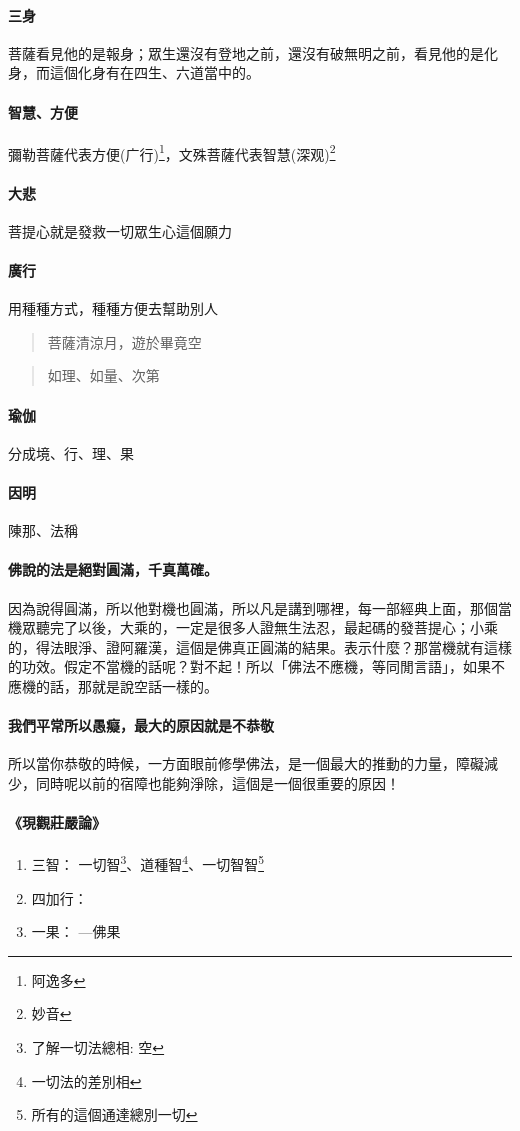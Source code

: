 \paragraph{三身}
菩薩看見他的是報身；眾生還沒有登地之前，還沒有破無明之前，看見他的是化身，而這個化身有在四生、六道當中的。
\paragraph{智慧、方便}
彌勒菩薩代表方便(广行)\footnote{阿逸多}，文殊菩薩代表智慧(深观)\footnote{妙音}
\paragraph{大悲}
菩提心就是發救一切眾生心這個願力
\paragraph{廣行}
用種種方式，種種方便去幫助別人
\begin{quote}
  菩薩清涼月，遊於畢竟空
\end{quote}
\begin{quote}
  如理、如量、次第
\end{quote}
\paragraph{瑜伽}分成境、行、理、果
\paragraph{因明}陳那、法稱

\paragraph{佛說的法是絕對圓滿，千真萬確。}
因為說得圓滿，所以他對機也圓滿，所以凡是講到哪裡，每一部經典上面，那個當機眾聽完了以後，大乘的，一定是很多人證無生法忍，最起碼的發菩提心；小乘的，得法眼淨、證阿羅漢，這個是佛真正圓滿的結果。表示什麼？那當機就有這樣的功效。假定不當機的話呢？對不起！所以「佛法不應機，等同閒言語」，如果不應機的話，那就是說空話一樣的。
\paragraph{我們平常所以愚癡，最大的原因就是不恭敬}
所以當你恭敬的時候，一方面眼前修學佛法，是一個最大的推動的力量，障礙減少，同時呢以前的宿障也能夠淨除，這個是一個很重要的原因！
\paragraph{《現觀莊嚴論》}
\begin{enumerate}
  \item 三智： 一切智\footnote{了解一切法總相: 空}、道種智\footnote{一切法的差別相}、一切智智\footnote{所有的這個通達總別一切}
  \item 四加行：
  \item 一果： —佛果
\end{enumerate}

